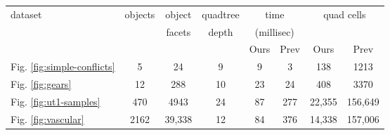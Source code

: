 \documentclass[final,3p,times,twocolumn]{elsarticle}
\begin{document}


\begin{table*}
  \centering
  \footnotesize{
  \begin{tabular}{lcc|c|cc|cc}
    \toprule
    dataset & objects & object          & quadtree
    & \multicolumn{2}{c|}{time} &  \multicolumn{2}{c}{quad cells} 
    \\
            &         & facets          & depth
    & \multicolumn{2}{c|}{(millisec)} & 
    \\
           &         &  & 
    & Ours & Prev & Ours & Prev \\
    \hline

    Fig. \ref{fig:simple-conflicts} & 5 & 24 & 9 & 9 & 3 & 138 & 1213  \\

    Fig. \ref{fig:gears} & 12 & 288 & 10 & 23 & 24 & 408 & 3370  \\

    Fig. \ref{fig:ut1-samples} & 470 & 4943 & 24 & 87 & 277 & 22,355 & 156,649  \\

    Fig. \ref{fig:vascular} & 2162 & 39,338 & 12 & 84 & 376 & 14,338 & 157,006  \\


\end{tabular}}
\end{table*}
\end{document}
